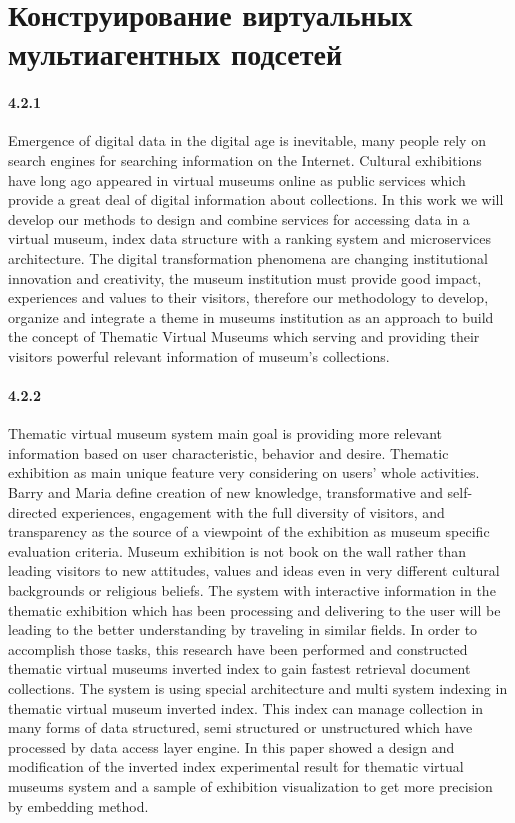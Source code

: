 \chapter{Конструирование виртуальных мультиагентных подсетей}\label{ch:ch4}

\subsubsection{4.2.1}

Emergence of digital data in the digital age is inevitable, many people rely on search engines for searching information on the Internet. Cultural exhibitions have long ago appeared in virtual museums online as public services which provide a great deal of digital information about collections. In this work we will develop our methods to design and combine services for accessing data in a virtual museum, index data structure with a ranking system and microservices architecture. The digital transformation phenomena are changing institutional innovation and creativity, the museum institution must provide good impact, experiences and values to their visitors, therefore our methodology to develop, organize and integrate a theme in museums institution as an approach to build the concept of Thematic Virtual Museums which serving and providing their visitors powerful relevant information of museum’s collections.

\subsubsection{4.2.2}

Thematic virtual museum system main goal is providing more relevant information based on user characteristic, behavior and desire. Thematic exhibition as main unique feature very considering on users' whole activities. Barry and Maria define creation of new knowledge, transformative and self-directed experiences, engagement with the full diversity of visitors, and transparency as the source of a viewpoint of the exhibition as museum specific evaluation criteria. Museum exhibition is not book on the wall rather than leading visitors to new attitudes, values and ideas even in very different cultural backgrounds or religious beliefs. The system with interactive information in the thematic exhibition which has been processing and delivering to the user will be leading to the better understanding by traveling in similar fields. In order to accomplish those tasks, this research have been performed and constructed thematic virtual museums inverted index to gain fastest retrieval document collections. The system is using special architecture and multi system indexing in thematic virtual museum inverted index. This index can manage collection in many forms of data structured, semi structured or unstructured which have processed by data access layer engine. In this paper showed a design and modification of the inverted index experimental result for thematic virtual museums system and a sample of exhibition visualization to get more precision by embedding method.

